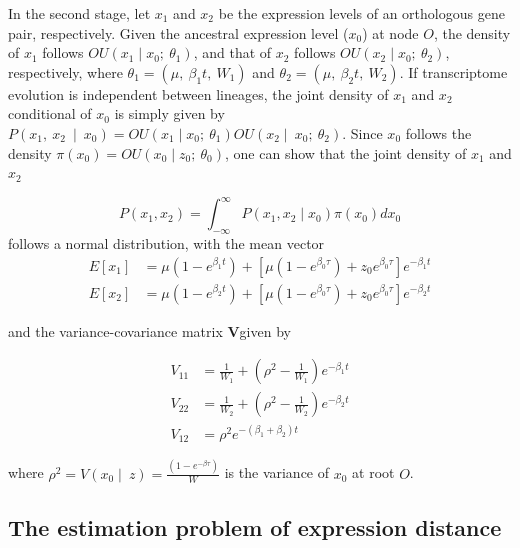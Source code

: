 \documentclass[]{book}
\begin{document}
In the second stage, let \(x_1\) and \(x_2\) be the expression levels of an orthologous gene pair, respectively. Given the ancestral expression level (\(x_0\)) at node \(O\), the density of \(x_1\) follows \(OU\left(x_1\mid x_0;\  \theta_{1}\right)\), and that of \(x_2\) follows \(OU\left(x_2\mid x_0;\  \theta_{2}\right)\), respectively, where \(\theta_{1}=\left(\mu,\  \beta_{1}t,\  W_{1}\right)\) and \(\theta_{2}=\left(\mu,\  \beta_{2}t,\  W_{2}\right)\). If transcriptome evolution is independent between lineages, the joint density of \(x_1\) and \(x_2\) conditional of \(x_0\) is simply given by \(P\left(x_1,\  x_2\  \mid\  x_0\right)=OU\left(x_1\mid x_0;\  \theta_1\right)OU\left(x_2\mid\  x_0;\  \theta_2\right)\). Since \(x_0\) follows the density \(\pi\left(x_0\right)=OU\left(x_0\mid z_0;\  \theta_{0}\right)\), one can show that the joint density of \(x_1\) and \(x_2\)

\[P\left(x_1,x_2\right)=\int_{-\infty}^{\infty}P\left(x_1,x_2\mid x_0\right)\pi\left(x_0\right)dx_0\tag{1.2}\]
follows a normal distribution, with the mean vector
\[
\begin{split}
E\left[x_1\right]&=\mu\left(1-e^{\beta_1t}\right)+\left[\mu\left(1-e^{\beta_0\tau}\right)+z_0e^{\beta_0\tau}\right]e^{-\beta_1t} \\
E\left[x_2\right]&=\mu\left(1-e^{\beta_2t}\right)+\left[\mu\left(1-e^{\beta_0\tau}\right)+z_0e^{\beta_0\tau}\right]e^{-\beta_2t} 
\end{split}\tag{1.3}
\]

and the variance-covariance matrix \(\boldsymbol{V}\)given by

\[
\begin{split}
V_{11}&=\frac{1}{W_1}+\left(\rho^2-\frac{1}{W_1}\right)e^{-\beta_1t}\\
V_{22}&=\frac{1}{W_2}+\left(\rho^2-\frac{1}{W_2}\right)e^{-\beta_2t}\\
V_{12}&=\rho^2e^{-\left(\beta_1+\beta_2\right)t}
\end{split}
\tag{1.4}
\]

where \(\rho^2=V\left(x_0\mid\  z\right)=\frac{\left(1-e^{-\beta\tau}\right)}{W}\) is the variance of \(x_0\) at root \(O\).

\hypertarget{the-estimation-problem-of-expression-distance}{%
\subsection{The estimation problem of expression distance}\label{the-estimation-problem-of-expression-distance}}
\end{document}
